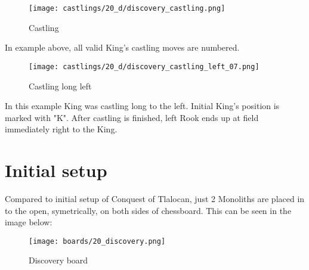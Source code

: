 \noindent
\begin{figure}[!h]
\texttt{[image: castlings/20\_d/discovery\_castling.png]}
\caption{Castling}
\label{fig:discovery_castling}
\end{figure}

In example above, all valid King's castling moves are numbered.

\noindent
\begin{figure}[!h]
\texttt{[image: castlings/20\_d/discovery\_castling\_left\_07.png]}
\caption{Castling long left}
\label{fig:discovery_castling_left_07}
\end{figure}

In this example King was castling long to the left. Initial King's position is marked with "K".
After castling is finished, left Rook ends up at field immediately right to the King.

\clearpage %

\section*{Initial setup}

Compared to initial setup of Conquest of Tlalocan, just 2 Monoliths are placed in to the open,
symetrically, on both sides of chessboard. This can be seen in the image below:

\noindent
\begin{figure}[h]
\texttt{[image: boards/20\_discovery.png]}
\caption{Discovery board}
\label{fig:20_discovery}
\end{figure}

\clearpage %
